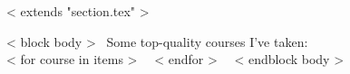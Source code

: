 ~< extends "section.tex" >~

~< block body >~
Some top-quality courses I've taken: \\

~< for course in items >~
~< endfor >~
~< endblock body >~

